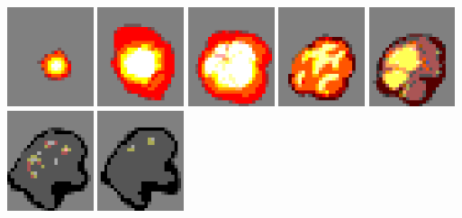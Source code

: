 \documentclass[10pt]{book}
\begin{document}
\begin{CJK}{UTF8}{gkai}
\begin{center}
\includegraphics[width=0.19\textwidth]{previews/nightstrike_1-FIRE-00.png}
\includegraphics[width=0.19\textwidth]{previews/nightstrike_1-FIRE-01.png}
\includegraphics[width=0.19\textwidth]{previews/nightstrike_1-FIRE-02.png}
\includegraphics[width=0.19\textwidth]{previews/nightstrike_1-FIRE-03.png}
\includegraphics[width=0.19\textwidth]{previews/nightstrike_1-FIRE-04.png}
\includegraphics[width=0.19\textwidth]{previews/nightstrike_1-FIRE-05.png}
\includegraphics[width=0.19\textwidth]{previews/nightstrike_1-FIRE-06.png}

\end{center}
\end{CJK}
\end{document}
